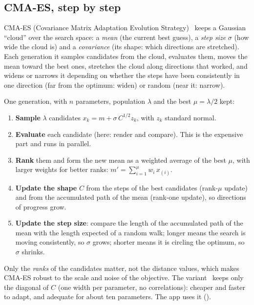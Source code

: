 \subsection{CMA-ES, step by step}

\begin{keyidea}
CMA-ES (Covariance Matrix Adaptation Evolution Strategy)~\cite{hansen2001cmaes}
keeps a Gaussian ``cloud'' over the search space: a \emph{mean} (the current
best guess), a \emph{step size} $\sigma$ (how wide the cloud is) and a
\emph{covariance} (its shape: which directions are stretched). Each generation
it samples candidates from the cloud, evaluates them, moves the mean toward the
best ones, stretches the cloud along directions that worked, and widens or
narrows it depending on whether the steps have been consistently in one
direction (far from the optimum: widen) or random (near it: narrow).
\end{keyidea}

One generation, with $n$ parameters, population $\lambda$ and the best
$\mu = \lambda/2$ kept:
\begin{enumerate}
\item \textbf{Sample} $\lambda$ candidates $x_k = m + \sigma\, C^{1/2} z_k$,
  with $z_k$ standard normal.
\item \textbf{Evaluate} each candidate (here: render and compare). This is the
  expensive part and runs in parallel.
\item \textbf{Rank} them and form the new mean as a weighted average of the
  best $\mu$, with larger weights for better ranks:
  $m' = \sum_{i=1}^{\mu} w_i\, x_{(i)}$.
\item \textbf{Update the shape} $C$ from the steps of the best candidates
  (rank-$\mu$ update) and from the accumulated path of the mean (rank-one
  update), so directions of progress grow.
\item \textbf{Update the step size}: compare the length of the accumulated path
  of the mean with the length expected of a random walk; longer means the
  search is moving consistently, so $\sigma$ grows; shorter means it is
  circling the optimum, so $\sigma$ shrinks.
\end{enumerate}
Only the \emph{ranks} of the candidates matter, not the distance values, which
makes CMA-ES robust to the scale and noise of the objective. The
 variant~\cite{ros2008sepcmaes} keeps only the diagonal of $C$
(one width per parameter, no correlations): cheaper and faster to adapt, and
adequate for about ten parameters. The app uses it ().

